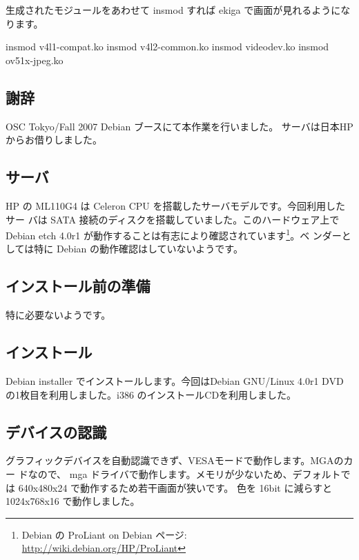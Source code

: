 \documentclass[mingoth,a4paper]{jsarticle}
\begin{document}
生成されたモジュールをあわせて insmod すれば ekiga で画面が見れるようになります。

\begin{commandline}
insmod v4l1-compat.ko
insmod v4l2-common.ko
insmod videodev.ko
insmod ov51x-jpeg.ko
\end{commandline}

\subsection{謝辞}

OSC Tokyo/Fall 2007 Debian ブースにて本作業を行いました。
サーバは日本HPからお借りしました。

\label{ML110G4}

\subsection{サーバ}

HP の ML110G4 は Celeron CPU を搭載したサーバモデルです。今回利用したサー
バは SATA 接続のディスクを搭載していました。このハードウェア上でDebian
etch 4.0r1 が動作することは有志により確認されています\footnote{Debian の
ProLiant on Debian ページ: \url{http://wiki.debian.org/HP/ProLiant}}。ベ
ンダーとしては特に Debian の動作確認はしていないようです。

\subsection{インストール前の準備}

特に必要ないようです。

\subsection{インストール}

Debian installer でインストールします。今回はDebian GNU/Linux 4.0r1 DVD 
の1枚目を利用しました。i386 のインストールCDを利用しました。

\subsection{デバイスの認識}

グラフィックデバイスを自動認識できず、VESAモードで動作します。MGAのカー
ドなので、 mga ドライバで動作します。メモリが少ないため、デフォルトでは 
640x480x24 で動作するため若干画面が狭いです。 色を 16bit に減らすと 
1024x768x16 で動作しました。
\end{document}
